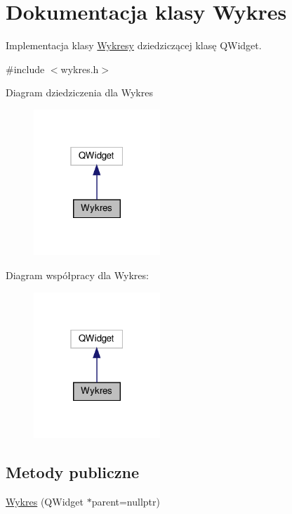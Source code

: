 \hypertarget{class_wykres}{}\section{Dokumentacja klasy Wykres}
\label{class_wykres}


Implementacja klasy \hyperlink{}{Wykresy} dziedziczącej klasę Q\+Widget.  




{\ttfamily \#include $<$wykres.\+h$>$}



Diagram dziedziczenia dla Wykres\nopagebreak
\begin{figure}[H]
\begin{center}
\leavevmode
\includegraphics[width=135pt]{class_wykres__inherit__graph}
\end{center}
\end{figure}


Diagram współpracy dla Wykres\+:\nopagebreak
\begin{figure}[H]
\begin{center}
\leavevmode
\includegraphics[width=135pt]{class_wykres__coll__graph}
\end{center}
\end{figure}
\subsection*{Metody publiczne}
\begin{DoxyCompactItemize}
\item 
\hyperlink{class_wykres_a925088821f6b8ff1e9d90eee68557bf6}{Wykres} (Q\+Widget $\ast$parent=nullptr)
\end{DoxyCompactItemize}
